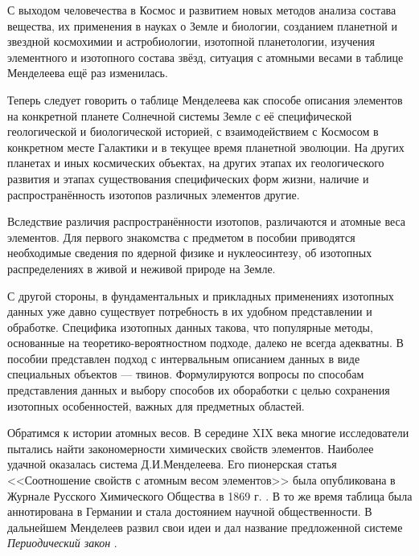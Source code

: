 \documentclass[a5paper,openany]{book}
\begin{document}
	С выходом человечества в Космос и развитием новых методов анализа состава вещества, их применения в науках о Земле и биологии, созданием планетной и звездной космохимии и астробиологии, изотопной планетологии, изучения элементного и изотопного состава звёзд, ситуация с атомными весами в таблице Менделеева ещё раз изменилась.  
	
	Теперь следует говорить о  таблице Менделеева как способе описания элементов на конкретной планете Солнечной системы Земле с её специфической геологической и биологической историей, с взаимодействием с Космосом в конкретном месте Галактики и в текущее время планетной эволюции.
	На других планетах и иных космических объектах, на других этапах их геологического развития и этапах существования специфических форм жизни, наличие и распространённость изотопов различных элементов другие. 
	
	Вследствие различия распространённости изотопов, различаются и атомные веса элементов. %
	Для первого знакомства с предметом в пособии приводятся необходимые сведения по  ядерной физике и нуклеосинтезу, об изотопных распределениях в живой и неживой природе на Земле.
	
	С другой стороны, в фундаментальных и прикладных применениях изотопных данных уже давно существует потребность в их удобном представлении и обработке. Специфика изотопных данных такова, что популярные методы, основанные на теоретико-вероятностном подходе, далеко не всегда адекватны. В пособии представлен подход с интервальным описанием данных в виде специальных объектов --- твинов. Формулируются вопросы по способам представления данных и выбору способов их обоработки с целью сохранения изотопных особенностей, важных для предметных областей.
	
	
	Обратимся к истории атомных весов.
	В середине XIX века многие исследователи пытались найти закономерности химических свойств элементов. Наиболее удачной оказалась система Д.И.Менделеева. Его пионерская статья <<Соотношение свойств с атомным весом элементов>> была опубликована в Журнале Русского Химического Общества в 1869 г. \cite{Mendeleev1869ru}. В то же время таблица была аннотирована в Германии \cite{Mendeleev1869} и стала достоянием научной общественности. В дальнейшем Менделеев развил свои идеи и дал название предложенной системе  \emph{Периодический закон} \cite{Mendeleev1870}.  
	
\end{document}
